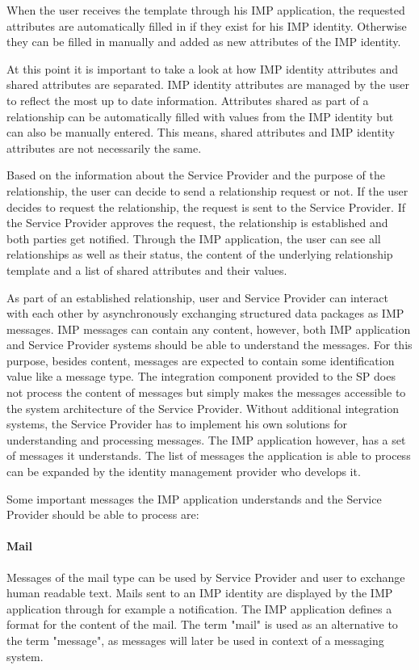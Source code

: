When the user receives the template through his IMP application, the requested attributes are automatically filled in if they exist for his IMP identity. Otherwise they can be filled in manually and added as new attributes of the IMP identity.

At this point it is important to take a look at how IMP identity attributes and shared attributes are separated. IMP identity attributes are managed by the user to reflect the most up to date information. Attributes shared as part of a relationship can be automatically filled with values from the IMP identity but can also be manually entered. This means, shared attributes and IMP identity attributes are not necessarily the same. 

Based on the information about the Service Provider and the purpose of the relationship, the user can decide to send a relationship request or not. If the user decides to request the relationship, the request is sent to the Service Provider. If the Service Provider approves the request, the relationship is established and both parties get notified. Through the IMP application, the user can see all relationships as well as their status, the content of the underlying relationship template and a list of shared attributes and their values.

As part of an established relationship, user and Service Provider can interact with each other by asynchronously exchanging structured data packages as IMP messages. IMP messages can contain any content, however, both IMP application and Service Provider systems should be able to understand the messages. For this purpose, besides content, messages are expected to contain some identification value like a message type. The integration component provided to the SP does not process the content of messages but simply makes the messages accessible to the system architecture of the Service Provider. Without additional integration systems, the Service Provider has to implement his own solutions for understanding and processing messages. The IMP application however, has a set of messages it understands. The list of messages the application is able to process can be expanded by the identity management provider who develops it.

Some important messages the IMP application understands and the Service Provider should be able to process are:

\paragraph{Mail} Messages of the mail type can be used by Service Provider and user to exchange human readable text. Mails sent to an IMP identity are displayed by the IMP application through for example a notification. 
The IMP application defines a format for the content of the mail. The term "mail" is used as an alternative to the term "message", as messages will later be used in context of a messaging system.

